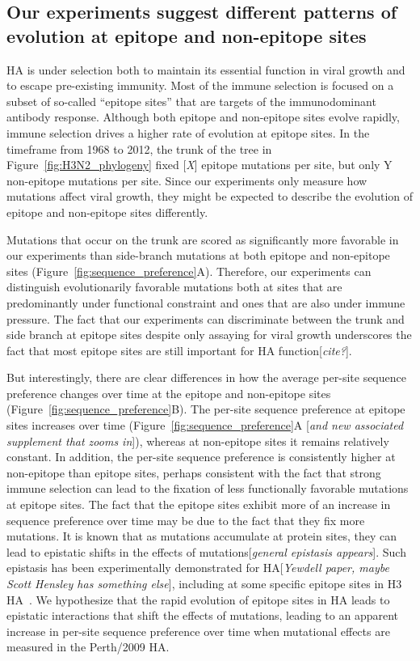 \documentclass[9pt,twocolumn,twoside]{pnas-new}
\newcommand{\comment}[1]{{\color{red}[\textsl{#1}]}}
\begin{document}
\subsection*{Our experiments suggest different patterns of evolution at epitope and non-epitope sites}
HA is under selection both to maintain its essential function in viral growth and to escape pre-existing immunity.
Most of the immune selection is focused on a subset of so-called ``epitope sites'' that are targets of the immunodominant antibody response.
Although both epitope and non-epitope sites evolve rapidly, immune selection drives a higher rate of evolution at epitope sites.
In the timeframe from 1968 to 2012, the trunk of the tree in Figure~\ref{fig:H3N2_phylogeny} fixed \comment{X} epitope mutations per site, but only Y non-epitope mutations per site.
Since our experiments only measure how mutations affect viral growth, they might be expected to describe the evolution of epitope and non-epitope sites differently.

Mutations that occur on the trunk are scored as significantly more favorable in our experiments than side-branch mutations at both epitope and non-epitope sites (Figure~\ref{fig:sequence_preference}A).
Therefore, our experiments can distinguish evolutionarily favorable mutations both at sites that are predominantly under functional constraint and ones that are also under immune pressure.
The fact that our experiments can discriminate between the trunk and side branch at epitope sites despite only assaying for viral growth underscores the fact that most epitope sites are still important for HA function\comment{cite?}. 

But interestingly, there are clear differences in how the average per-site sequence preference changes over time at the epitope and non-epitope sites (Figure~\ref{fig:sequence_preference}B).
The per-site sequence preference at epitope sites increases over time (Figure~\ref{fig:sequence_preference}A \comment{and new associated supplement that zooms in}), whereas at non-epitope sites it remains relatively constant.
In addition, the per-site sequence preference is consistently higher at non-epitope than epitope sites, perhaps consistent with the fact that strong immune selection can lead to the fixation of less functionally favorable mutations at epitope sites.
The fact that the epitope sites exhibit more of an increase in sequence preference over time may be due to the fact that they fix more mutations.
It is known that as mutations accumulate at protein sites, they can lead to epistatic shifts in the effects of mutations\comment{general epistasis appears}.
Such epistasis has been experimentally demonstrated for HA\comment{Yewdell paper, maybe Scott Hensley has something else}, including at some specific epitope sites in H3 HA~\cite{wu2017diversity}.
We hypothesize that the rapid evolution of epitope sites in HA leads to epistatic interactions that shift the effects of mutations, leading to an apparent increase in per-site sequence preference over time when mutational effects are measured in the Perth/2009 HA.
\end{document}
